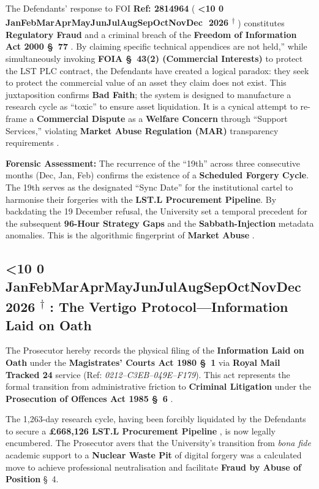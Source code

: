 \documentclass{EMBASSY}
\DeclareRobustCommand{\gmt}[3]{%
    \texorpdfstring{%
        {\color{DateGold}\textbf{%
            \ifnum#1<10 0\fi#1\,\textperiodcentered\,%
            \ifcase#2\or Jan\or Feb\or Mar\or Apr\or May\or Jun\or Jul\or Aug\or Sep\or Oct\or Nov\or Dec\fi
            \,\textperiodcentered\,20#3%
            \textsuperscript{$\dagger$}%
        }}%
    }{%
        (#1/#2/#3)%
    }%
}
\begin{document}
\noindent The Defendants' response to FOI \textbf{Ref: 2814964} (\gmt{16}{3}{26}) constitutes \textbf{Regulatory Fraud} and a criminal breach of the \textbf{Freedom of Information Act 2000 \S~77} \cite{FOIA00}. By claiming specific technical appendices are not held,'' while simultaneously invoking \textbf{FOIA \S~43(2) (Commercial Interests)} \cite{ICO-Section43} to protect the LST PLC contract, the Defendants have created a logical paradox: they seek to protect the commercial value of an asset they claim does not exist. This juxtaposition confirms \textbf{Bad Faith}; the system is designed to manufacture a research cycle as ``toxic'' to ensure asset liquidation. It is a cynical attempt to re-frame a \textbf{Commercial Dispute} as a \textbf{Welfare Concern} through ``Support Services,'' violating \textbf{Market Abuse Regulation (MAR)} transparency requirements \cite{UKMAR}.

\textbf{Forensic Assessment:} The recurrence of the ``19th'' across three consecutive months (Dec, Jan, Feb) confirms the existence of a \textbf{Scheduled Forgery Cycle}. The 19th serves as the designated ``Sync Date'' for the institutional cartel to harmonise their forgeries with the \textbf{LST.L Procurement Pipeline}. By backdating the 19 December refusal, the University set a temporal precedent for the subsequent \textbf{96-Hour Strategy Gaps} and the \textbf{Sabbath-Injection} metadata anomalies. This is the algorithmic fingerprint of \textbf{Market Abuse} \cite{UKMAR}.

\subsection{\gmt{23}{3}{26}: The Vertigo Protocol---Information Laid on Oath}
The Prosecutor hereby records the physical filing of the \textbf{Information Laid on Oath} under the \textbf{Magistrates' Courts Act 1980 \S~1} \cite{MCA80} via \textbf{Royal Mail Tracked 24} service (Ref: \textit{0212--C3EB--049E--F179}). This act represents the formal transition from administrative friction to \textbf{Criminal Litigation} under the \textbf{Prosecution of Offences Act 1985 \S~6} \cite{ProsecutionOfOffencesAct85}.

The 1,263-day research cycle, having been forcibly liquidated by the Defendants to secure a \textbf{\pounds668,126 LST.L Procurement Pipeline} \cite{SIG05}, is now legally encumbered. The Prosecutor avers that the University’s transition from \textit{bona fide} academic support to a \textbf{Nuclear Waste Pit} of digital forgery \cite{FCA81} was a calculated move to achieve professional neutralisation and facilitate \textbf{Fraud by Abuse of Position} \cite{FraudAct06} \S~4.
\end{document}
